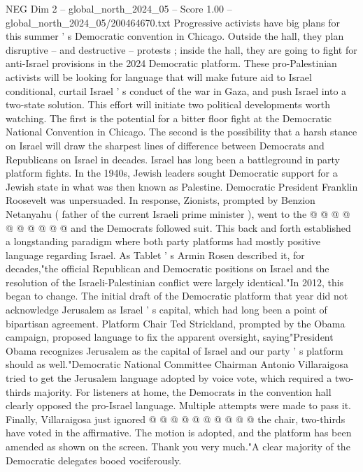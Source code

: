 \begin{textsample}{NEG Dim 2 – global\_north\_2024\_05 – Score 1.00 – global\_north\_2024\_05/200464670.txt}  \label{ex:f2_neg_158}
Progressive activists have big plans for this summer ' s Democratic convention in Chicago.
Outside the hall, they plan disruptive -- and destructive -- protests ; inside the hall, they are going to fight for anti-Israel provisions in the 2024 Democratic platform.
These pro-Palestinian activists will be looking for language that will make future aid to Israel conditional, curtail Israel ' s conduct of the war in Gaza, and push Israel into a two-state solution.
This effort will initiate two political developments worth watching.
The first is the potential for a bitter floor fight at the Democratic National Convention in Chicago.
The second is the possibility that a harsh stance on Israel will draw the sharpest lines of difference between Democrats and Republicans on Israel in decades.
Israel has long been a battleground in party platform fights.
In the 1940s, Jewish leaders sought Democratic support for a Jewish state in what was then known as Palestine.
Democratic President Franklin Roosevelt was unpersuaded.
In response, Zionists, prompted by Benzion Netanyahu ( father of the current Israeli prime minister ), went to the @ @ @ @ @ @ @ @ @ @ and the Democrats followed suit.
This back and forth established a longstanding paradigm where both party platforms had mostly positive language regarding Israel.
As Tablet ' s Armin Rosen described it, for decades,"the official Republican and Democratic positions on Israel and the resolution of the Israeli-Palestinian conflict were largely identical."In 2012, this began to change.
The initial draft of the Democratic platform that year did not acknowledge Jerusalem as Israel ' s capital, which had long been a point of bipartisan agreement.
Platform Chair Ted Strickland, prompted by the Obama campaign, proposed language to fix the apparent oversight, saying"President Obama recognizes Jerusalem as the capital of Israel and our party ' s platform should as well."Democratic National Committee Chairman Antonio Villaraigosa tried to get the Jerusalem language adopted by voice vote, which required a two-thirds majority.
For listeners at home, the Democrats in the convention hall clearly opposed the pro-Israel language.
Multiple attempts were made to pass it.
Finally, Villaraigosa just ignored @ @ @ @ @ @ @ @ @ @ the chair, two-thirds have voted in the affirmative.
The motion is adopted, and the platform has been amended as shown on the screen.
Thank you very much."A clear majority of the Democratic delegates booed vociferously.

\end{textsample}
